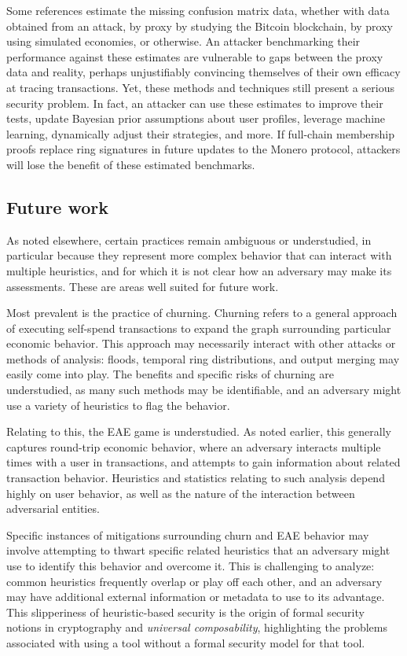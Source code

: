 \documentclass{article}
\theoremstyle{definition}
\begin{document}
Some references estimate the missing confusion matrix data, whether with data obtained from an attack, by proxy by studying the Bitcoin blockchain, by proxy using simulated economies, or otherwise.
An attacker benchmarking their performance against these estimates are vulnerable to gaps between the proxy data and reality, perhaps unjustifiably convincing themselves of their own efficacy at tracing transactions.
Yet, these methods and techniques still present a serious security problem.
In fact, an attacker can use these estimates to improve their tests, update Bayesian prior assumptions about user profiles, leverage machine learning, dynamically adjust their strategies, and more.
If full-chain membership proofs replace ring signatures in future updates to the Monero protocol, attackers will lose the benefit of these estimated benchmarks.


\subsection{Future work}\label{sec:future}

As noted elsewhere, certain practices remain ambiguous or understudied, in particular because they represent more complex behavior that can interact with multiple heuristics, and for which it is not clear how an adversary may make its assessments.
These are areas well suited for future work.

Most prevalent is the practice of churning.
Churning refers to a general approach of executing self-spend transactions to expand the graph surrounding particular economic behavior.
This approach may necessarily interact with other attacks or methods of analysis: floods, temporal ring distributions, and output merging may easily come into play.
The benefits and specific risks of churning are understudied, as many such methods may be identifiable, and an adversary might use a variety of heuristics to flag the behavior.

Relating to this, the EAE game is understudied.
As noted earlier, this generally captures round-trip economic behavior, where an adversary interacts multiple times with a user in transactions, and attempts to gain information about related transaction behavior.
Heuristics and statistics relating to such analysis depend highly on user behavior, as well as the nature of the interaction between adversarial entities.

Specific instances of mitigations surrounding churn and EAE behavior may involve attempting to thwart specific related heuristics that an adversary might use to identify this behavior and overcome it.
This is challenging to analyze: common heuristics frequently overlap or play off each other, and an adversary may have additional external information or metadata to use to its advantage.
This slipperiness of heuristic-based security is the origin of formal security notions in cryptography and \textit{universal composability}, highlighting the problems associated with using a tool without a formal security model for that tool.
\end{document}

